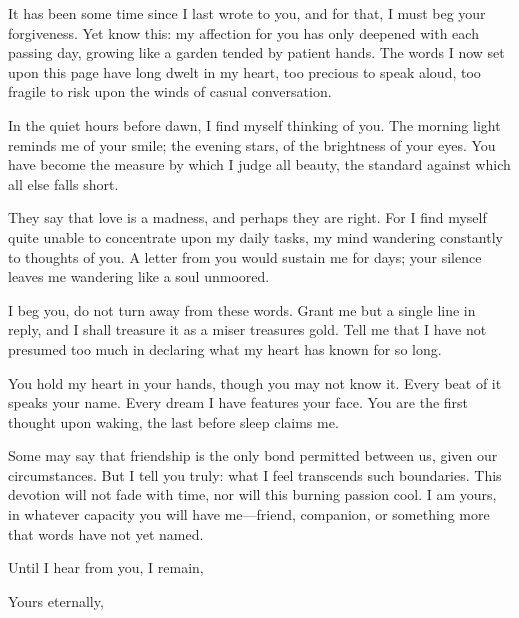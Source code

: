 \documentclass{../vintageletter}
\begin{document}

It has been some time since I last wrote to you, and for that, I must beg your forgiveness. Yet know this: my affection for you has only deepened with each passing day, growing like a garden tended by patient hands. The words I now set upon this page have long dwelt in my heart, too precious to speak aloud, too fragile to risk upon the winds of casual conversation.

\ornrule

In the quiet hours before dawn, I find myself thinking of you. The morning light reminds me of your smile; the evening stars, of the brightness of your eyes. You have become the measure by which I judge all beauty, the standard against which all else falls short.

They say that love is a madness, and perhaps they are right. For I find myself quite unable to concentrate upon my daily tasks, my mind wandering constantly to thoughts of you. A letter from you would sustain me for days; your silence leaves me wandering like a soul unmoored.

\ornrule

I beg you, do not turn away from these words. Grant me but a single line in reply, and I shall treasure it as a miser treasures gold. Tell me that I have not presumed too much in declaring what my heart has known for so long.

You hold my heart in your hands, though you may not know it. Every beat of it speaks your name. Every dream I have features your face. You are the first thought upon waking, the last before sleep claims me.

\ornrule

Some may say that friendship is the only bond permitted between us, given our circumstances. But I tell you truly: what I feel transcends such boundaries. This devotion will not fade with time, nor will this burning passion cool. I am yours, in whatever capacity you will have me—friend, companion, or something more that words have not yet named.

\ornrule

Until I hear from you, I remain,

\begin{dedication}
Yours eternally,
\end{dedication}

\signature{A.}
\end{document}

